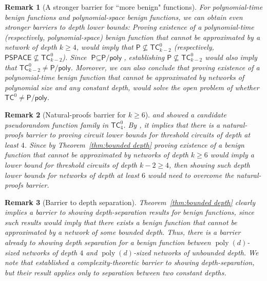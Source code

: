 \documentclass[11pt]{article}
\newtheorem{remark}{Remark}[section]
\DeclareMathOperator{\poly}{poly}
\newcommand{\TC}{\textsf{TC}}
\newcommand{\Ppoly}{\textsf{P/poly}}
\newcommand{\Ptime}{\textsf{P}}
\newcommand{\PSPACE}{\textsf{PSPACE}}
\begin{document}
\begin{remark}[A stronger barrier for ``more benign" functions]
	For polynomial-time benign functions and polynomial-space benign functions, 
	we can obtain even stronger barriers to depth lower bounds: Proving existence of a polynomial-time (respectively,  polynomial-space) benign function that cannot be approximated by a network of depth $k \geq 4$, would imply that $\Ptime \not \subseteq \TC^0_{k-2}$ (respectively, $\PSPACE \not \subseteq \TC^0_{k-2}$). 
	Since $\Ptime \subseteq \Ppoly$, establishing $\Ptime \not \subseteq \TC^0_{k-2}$ would also imply that $\TC^0_{k-2} \neq \Ppoly$. 
	Moreover, we can also conclude that proving existence of a polynomial-time benign function that cannot be approximated by networks of polynomial size and any constant depth, would solve the open problem of whether $\TC^0 \neq \Ppoly$. 
\end{remark}

\begin{remark}[Natural-proofs barrier for $k \geq 6$]
\label{rem:natural proof}
	\cite{naor2004number} and \cite{krause2001pseudorandom} showed a candidate pseudorandom function family in $\TC^0_4$. By \cite{razborov1997natural}, it implies that there is a natural-proofs barrier to proving circuit lower bounds for threshold circuits of depth at least $4$. Since by 
	Theorem~\ref{thm:bounded depth} 
	proving existence of a benign function that cannot be approximated by networks of depth $k \geq 6$ would imply a lower bound for threshold circuits of depth $k-2 \geq 4$, then showing such depth lower bounds for networks of depth at least $6$ would need to overcome the natural-proofs barrier.	
\end{remark}

\begin{remark}[Barrier to depth separation]
	Theorem~\ref{thm:bounded depth}	clearly implies a barrier to showing depth-separation results for benign functions, since such results would imply that there exists a benign function that cannot be approximated by a network of some bounded depth. Thus, there is a barrier already to showing depth separation for a benign function between $\poly(d)$-sized networks of depth $4$ and $\poly(d)$-sized networks of 
	unbounded depth.
	We note that \cite{vardi2020neural} established a complexity-theoretic barrier to showing depth-separation, but their result applies only to separation between two constant depths.
\end{remark}
 
\end{document}
